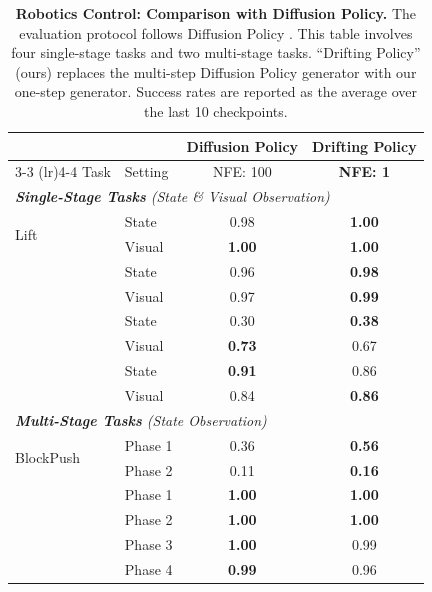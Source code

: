 \begin{table}[t]
    \centering
    \caption{\textbf{Robotics Control: Comparison with Diffusion Policy.}
    The evaluation protocol follows Diffusion Policy \citep{chi2025diffusion}.
    This table involves four single-stage tasks and two multi-stage tasks.
    ``Drifting Policy'' (ours) replaces the multi-step Diffusion Policy generator with our one-step generator.
    Success rates are reported as the average over the last 10 checkpoints.
    }
    \label{tab:robotics_combined}
    \scriptsize
        \begin{tabular}{llcc}
            \toprule
            & & \multicolumn{1}{c}{{Diffusion Policy}} & \multicolumn{1}{c}{\textbf{Drifting Policy}} \\
            \cmidrule(lr){3-3} \cmidrule(lr){4-4}
            Task & Setting & \multicolumn{1}{c}{{NFE: 100}} & \multicolumn{1}{c}{\textbf{NFE: 1}} \\
            \midrule
            \multicolumn{4}{l}{\textit{\textbf{Single-Stage Tasks} (State \& Visual Observation)}} \\
            \midrule
            \multirow{2}{*}{Lift} & State & {0.98} & \textbf{1.00} \\
             & Visual & {\textbf{1.00}} & \textbf{1.00} \\
            \addlinespace[0.3em]
            \multirow{2}{*}{Can} & State & {0.96} & \textbf{0.98} \\
             & Visual & {0.97} & \textbf{0.99} \\
            \addlinespace[0.3em]
            \multirow{2}{*}{ToolHang} & State & {0.30} & \textbf{0.38} \\
             & Visual & {\textbf{0.73}} & 0.67 \\
            \addlinespace[0.3em]
            \multirow{2}{*}{PushT} & State & {\textbf{0.91}} & 0.86 \\
             & Visual & {0.84} & \textbf{0.86} \\
            
            \midrule
            \multicolumn{4}{l}{\textit{\textbf{Multi-Stage Tasks} (State Observation)}} \\
            \midrule
            \multirow{2}{*}{BlockPush} & Phase 1 & {0.36} & \textbf{0.56} \\
             & Phase 2 & {0.11} & \textbf{0.16} \\
            \addlinespace[0.3em]
            \multirow{4}{*}{Kitchen} & Phase 1 & {\textbf{1.00}} & \textbf{1.00} \\
             & Phase 2 & {\textbf{1.00}} & \textbf{1.00} \\
             & Phase 3 & {\textbf{1.00}} & 0.99 \\
             & Phase 4 & {\textbf{0.99}} & 0.96 \\
            \bottomrule
        \end{tabular}
        \vspace{-0.5em}
\end{table}

